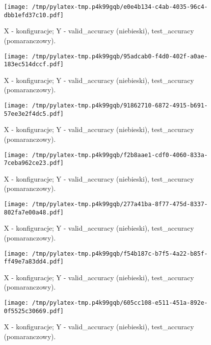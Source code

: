 \documentclass{article}%
\begin{document}
%
\newpage%


\begin{figure}[h]%
\centering%
\texttt{[image: /tmp/pylatex-tmp.p4k99gqb/e0e4b134-c4ab-4035-96c4-dbb1efd37c10.pdf]}%
\caption{X {-} konfiguracje; Y {-} valid\_accuracy (niebieski), test\_accuracy (pomaranczowy).}%
\end{figure}

%
\newpage%


\begin{figure}[h]%
\centering%
\texttt{[image: /tmp/pylatex-tmp.p4k99gqb/95adcab0-f4d0-402f-a0ae-183ec514dccf.pdf]}%
\caption{X {-} konfiguracje; Y {-} valid\_accuracy (niebieski), test\_accuracy (pomaranczowy).}%
\end{figure}

%
\newpage%


\begin{figure}[h]%
\centering%
\texttt{[image: /tmp/pylatex-tmp.p4k99gqb/91862710-6872-4915-b691-57ee3e2f4dc5.pdf]}%
\caption{X {-} konfiguracje; Y {-} valid\_accuracy (niebieski), test\_accuracy (pomaranczowy).}%
\end{figure}

%
\newpage%


\begin{figure}[h]%
\centering%
\texttt{[image: /tmp/pylatex-tmp.p4k99gqb/f2b8aae1-cdf0-4060-833a-7ceba962ce23.pdf]}%
\caption{X {-} konfiguracje; Y {-} valid\_accuracy (niebieski), test\_accuracy (pomaranczowy).}%
\end{figure}

%
\newpage%


\begin{figure}[h]%
\centering%
\texttt{[image: /tmp/pylatex-tmp.p4k99gqb/277a41ba-8f77-475d-8337-802fa7e00a48.pdf]}%
\caption{X {-} konfiguracje; Y {-} valid\_accuracy (niebieski), test\_accuracy (pomaranczowy).}%
\end{figure}

%
\newpage%


\begin{figure}[h]%
\centering%
\texttt{[image: /tmp/pylatex-tmp.p4k99gqb/f54b187c-b7f5-4a22-b85f-ff49e7a83dd4.pdf]}%
\caption{X {-} konfiguracje; Y {-} valid\_accuracy (niebieski), test\_accuracy (pomaranczowy).}%
\end{figure}

%
\newpage%


\begin{figure}[h]%
\centering%
\texttt{[image: /tmp/pylatex-tmp.p4k99gqb/605cc108-e511-451a-892e-0f5525c30669.pdf]}%
\caption{X {-} konfiguracje; Y {-} valid\_accuracy (niebieski), test\_accuracy (pomaranczowy).}%
\end{figure}
\end{document}
